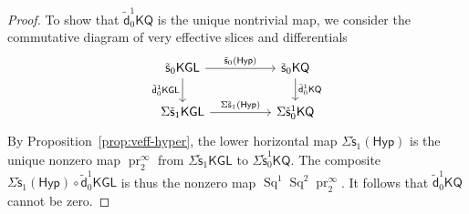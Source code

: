 \documentclass[11pt,hyp,english]{article}
\newcommand{\Z}{\mathbb{Z}}
\newcommand{\Q}{\mathbb{Q}}
\newcommand{\KGL}{\mathsf{KGL}}
\newcommand{\KQ}{\mathsf{KQ}}
\newcommand{\Sq}{\operatorname{Sq}}
\newcommand{\pr}{\operatorname{pr}}
\newcommand{\s}{\mathsf{s}}
\newcommand{\vs}{\tilde{\mathsf{s}}}
\newcommand{\vd}{{\tilde{\mathsf{d}}}}
\newcommand{\Forg}{\mathsf{Forg}}
\newcommand{\Hyper}{\mathsf{Hyp}}
\theoremstyle{definition}
\begin{document}
\begin{proof}
To show that $\vd_0^1 \KQ$ is the unique nontrivial map, we consider the commutative diagram of very effective slices and differentials
\[
\begin{tikzcd}
\vs_0\KGL \ar[rr,"\vs_0(\Hyper)"] \ar[d,"\vd^1_0\KGL"']  && 
\vs_0\KQ  \ar[d,"\vd^1_0\KQ "] \\
\Sigma\vs_1\KGL \ar[rr,"\Sigma\vs_1(\Hyper)"] && 
\Sigma\vs^1_0\KQ 
\end{tikzcd}
\]
By Proposition~\ref{prop:veff-hyper}, 
the lower horizontal map $\Sigma\vs_1(\Hyper)$ is the unique nonzero map $\pr^\infty_2$ from 
$\Sigma\vs_1\KGL$ to $\Sigma\vs^1_0\KQ $.
The composite $\Sigma\vs_1(\Hyper)\circ\vd^1_0\KGL$ is thus the nonzero map $\Sq^1\Sq^2\pr^\infty_2$.
It follows that $\vd^1_0\KQ $ cannot be zero.
\end{proof}
\end{document}

